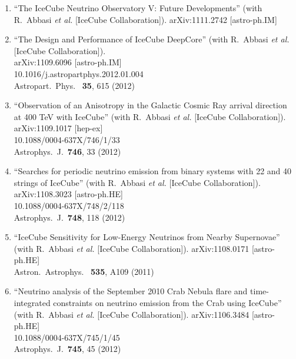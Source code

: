 \begin{enumerate}


\item ``The IceCube Neutrino Observatory V: Future Developments'' (with R.~Abbasi {\it et al.}  [IceCube Collaboration]). arXiv:1111.2742 [astro-ph.IM]
  


\item ``The Design and Performance of IceCube DeepCore'' (with R.~Abbasi {\it
  et al.}  [IceCube Collaboration]).  \\{}arXiv:1109.6096 [astro-ph.IM]
  \\{}10.1016/j.astropartphys.2012.01.004 \\{}Astropart.\ Phys.\ {\bf
    35}, 615 (2012) %


\item ``Observation of an Anisotropy in the Galactic Cosmic Ray arrival
  direction at 400 TeV with IceCube'' (with R.~Abbasi {\it et al.}
  [IceCube Collaboration]).  \\{}arXiv:1109.1017 [hep-ex]
  \\{}10.1088/0004-637X/746/1/33 \\{}Astrophys.\ J.\ {\bf 746}, 33
  (2012) %


\item ``Searches for periodic neutrino emission from binary systems with 22
  and 40 strings of IceCube'' (with R.~Abbasi {\it et al.}  [IceCube
    Collaboration]).  \\{}arXiv:1108.3023 [astro-ph.HE]
  \\{}10.1088/0004-637X/748/2/118 \\{}Astrophys.\ J.\ {\bf 748}, 118
  (2012) %



\item ``IceCube Sensitivity for Low-Energy Neutrinos from Nearby
  Supernovae'' (with R.~Abbasi {\it et al.}  [IceCube Collaboration]). arXiv:1108.0171 [astro-ph.HE] \\{}Astron.\ Astrophys.\ {\bf
    535}, A109 (2011) %


\item ``Neutrino analysis of the September 2010 Crab Nebula flare and
  time-integrated constraints on neutrino emission from the Crab using
  IceCube'' (with R.~Abbasi {\it et al.}  [IceCube Collaboration]). arXiv:1106.3484 [astro-ph.HE] \\{}10.1088/0004-637X/745/1/45
  \\{}Astrophys.\ J.\ {\bf 745}, 45 (2012) %



\end{enumerate}
